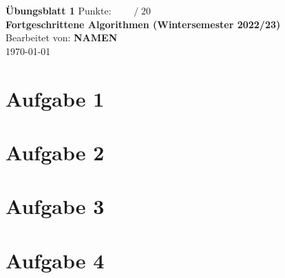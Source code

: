 \documentclass[a4paper]{scrartcl}
\def\sheetNumber{1}
\def\names{NAMEN}
\def\sumPoints{20}
\begin{document}
 

\begin{doublespace} %
\noindent \textbf{\LARGE{Übungsblatt \sheetNumber}}
\hfill  {\large Punkte: $\boxed{\qquad  /\; \sumPoints}$}\\
{\Large \textbf{Fortgeschrittene Algorithmen (Wintersemester 2022/23)}\\
Bearbeitet von: \textbf{\names}\\
\today}
\end{doublespace}


\section*{Aufgabe 1}

\section*{Aufgabe 2}

\section*{Aufgabe 3}

\section*{Aufgabe 4}


\end{document}
